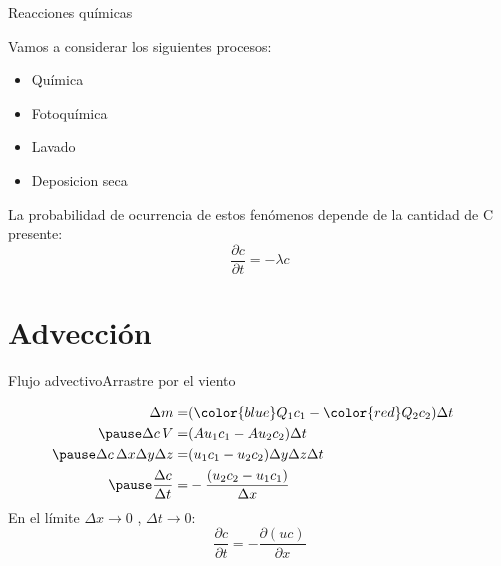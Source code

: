 \begin{frame}{Reacciones químicas}
\begin{center}
\QuimPict
\end{center}
 
 Vamos a considerar los siguientes procesos:
\begin{itemize}%
\item Química %
\item Fotoquímica %
\item Lavado  %
\item Deposicion seca %
\end{itemize}
 
La probabilidad de ocurrencia de estos fenómenos depende de la cantidad de C presente:
\pause
$$ \dfrac{\partial c}{\partial t} = - \lambda c $$
 
\end{frame}







\section{Advección}
\begin{frame}{Flujo advectivo}{Arrastre por el viento}
\begin{center}
\AdvectPict
\end{center}
\pause
$$
\begin{aligned}
\Delta m =&( {\color{blue} Q_1 c_1}  -   {\color{red} Q_2 c_2} ) \Delta t &\\ \pause
\Delta c\,V =&(A u_1 c_1  -  A u_2 c_2) \Delta t &\\\pause
\Delta c\,\Delta x \Delta y \Delta z  =&( u_1 c_1  -  u_2 c_2)\Delta y\Delta z \Delta t &\\\pause
\dfrac{\Delta c}{\Delta t} =& - \dfrac{(u_2 c_2 - u_1 c_1)}{\Delta x}
\end{aligned}
$$
\pause
En el límite $\Delta x\to 0$ , $\Delta t \to 0$:
   $$\boxed{ \dfrac{\partial c} {\partial t}=-\dfrac{\partial (uc)}{\partial x} }$$
   
\end{frame}

